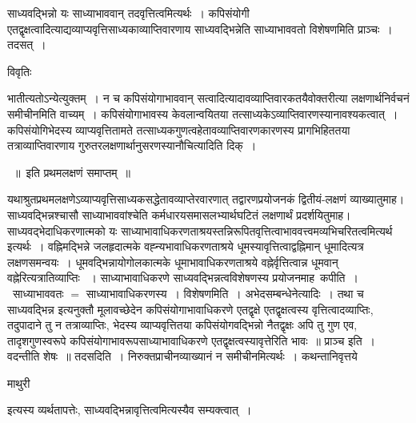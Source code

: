 \documentclass[10pt, openany]{book}
\begin{document}
{{साध्यवद्भिन्नो यः साध्याभाववान् तदवृत्तित्वमित्यर्थः~। कपिसंयोगी एतद्वृक्षत्वादित्याद्यव्याप्यवृत्तिसाध्यकाव्याप्तिवारणाय {\qt साध्यवद्भिन्नेति }साध्याभाववतो विशेषणमिति प्राञ्चः~। तदसत्~।}
\begin{center}     विवृतिः \end{center}
भातीत्यतोऽन्येत्युक्तम्~। न च कपिसंयोगाभाववान् सत्वादित्यादावव्याप्तिवारकतयैवोक्तरीत्या लक्षणार्थनिर्वचनं समीचीनमिति वाच्यम्~। कपिसंयोगाभावस्य केवलान्वयितया तत्साध्यकेऽव्याप्तिवारणस्यानावश्यकत्वात्~। कपिसंयोगिभेदस्य व्याप्यवृत्तितामते तत्साध्यकगुणत्वहेतावव्याप्तिवारणकारणस्य प्रागभिहिततया तत्राव्याप्तिवारणाय गुरुतरलक्षणार्थानुसरणस्यानौचित्यादिति दिक्~।
\begin{center}
~॥~इति प्रथमलक्षणं समाप्तम्~॥~
\end{center}

यथाश्रुतप्रथमलक्षणेऽव्याप्यवृत्तिसाध्यकसद्धेतावव्याप्तेरवारणात् तद्वारणप्रयोजनकं द्वितीयं-लक्षणं व्याख्यातुमाह।\\

साध्यवद्भिन्नश्चासौ साध्याभाववांश्चेति कर्मधारयसमासलभ्यार्थघटितं लक्षणार्थं प्रदर्शयितुमाह। साध्यवद्भेदाधिकरणात्मको यः साध्याभावाधिकरणताश्रयस्तन्निरूपितवृत्तित्वाभाववत्त्वमव्यभिचरितत्वमित्यर्थ इत्यर्थः~। वह्निमद्भिन्ने जलहृदात्मके वह्न्यभावाधिकरणताश्रये धूमस्यावृत्तित्वाद्वह्निमान् धूमादित्यत्र लक्षणसमन्वयः~। धूमवद्भिन्नायोगोलकात्मके धूमाभावाधिकरणताश्रये वह्नेर्वृत्तित्वान्न धूमवान् वह्नेरित्यत्रातिव्याप्तिः ~। साध्याभावाधिकरणे साध्यवद्भिन्नत्वविशेषणस्य प्रयोजनमाह\textemdash\ {\la कपीति~।}~साध्याभाववतः $=$ साध्याभावाधिकरणस्य~। विशेषणमिति~। अभेदसम्बन्धेनेत्यादिः~। तथा च साध्यवद्भिन्न इत्यनुक्तौ मूलावच्छेदेन कपिसंयोगाभावाधिकरणे एतद्वृक्षे एतद्वृक्षत्वस्य वृत्तित्वादव्याप्तिः, तदुपादाने तु न तत्राव्याप्तिः, भेदस्य व्याप्यवृत्तितया कपिसंयोगवद्भिन्नो नैतद्वृक्षः अपि तु गुण एव, तादृशगुणस्वरूपे कपिसंयोगाभावरूपसाध्याभावाधिकरणे एतद्वृक्षत्वस्यावृत्तेरिति भावः~॥ प्राञ्च इति~। वदन्तीति शेषः~॥ तदसदिति~। निरुक्तप्राचीनव्याख्यानं न समीचीनमित्यर्थः~। कथन्तानिवृत्तये
\newpage
 \begin{center}  माथुरी  \end{center} 
{ इत्यस्य व्यर्थतापत्तेः, साध्यवद्भिन्नावृत्तित्वमित्यस्यैव सम्यक्त्वात्~।~\\


}}
\end{document}
